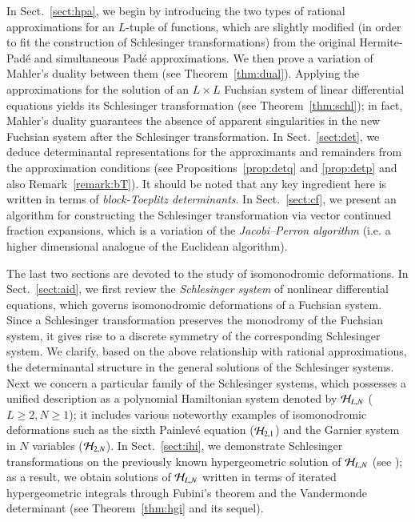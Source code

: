 \documentclass[12pt]{article}
\numberwithin{equation}{section}
\begin{document}
In Sect.~\ref{sect:hpa},
we begin by introducing 
the two types of rational approximations for an $L$-tuple of functions,
which are slightly modified
(in order to fit the construction of Schlesinger transformations)
from the original Hermite-Pad\'e and simultaneous Pad\'e approximations.
We then prove a variation of Mahler's duality between them (see Theorem~\ref{thm:dual}).
Applying the approximations for the solution of an $L \times L$ Fuchsian system of linear differential equations
yields its Schlesinger transformation
(see Theorem~\ref{thm:schl});
in fact,
Mahler's duality guarantees
 the absence of apparent singularities in the new Fuchsian system
after the Schlesinger transformation.
In Sect.~\ref{sect:det},
we deduce determinantal representations for the approximants and remainders
 from the approximation conditions
(see Propositions~\ref{prop:detq}  and \ref{prop:detp}
 and also Remark~\ref{remark:bT}).
 It should be noted that any key ingredient here 
is
 written in terms of {\it block-Toeplitz determinants}.
In Sect.~\ref{sect:cf},
we present an algorithm for constructing  the Schlesinger transformation via vector continued fraction expansions,
which is  a variation of the {\it Jacobi--Perron algorithm}
(i.e. a higher dimensional analogue of the Euclidean algorithm).


The last two sections are devoted to the study of isomonodromic deformations.
In Sect.~\ref{sect:aid},
we first review  the {\it Schlesinger system}
of nonlinear differential equations,
which
governs  isomonodromic deformations of a Fuchsian system.
Since a Schlesinger transformation preserves
 the monodromy of the
Fuchsian system, 
it gives rise to a discrete symmetry of the corresponding Schlesinger system.
We clarify,
based on the above relationship with rational approximations,
 the determinantal structure in the general solutions of the Schlesinger systems.
Next we concern
a particular family
of the Schlesinger systems,
which possesses a unified description as a
polynomial Hamiltonian system denoted by ${\cal H}_{L,N}$ ($L \geq 2, N \geq 1$);
it includes various noteworthy examples 
of isomonodromic deformations 
such as 
the sixth Painlev\'e equation (${\cal H}_{2,1}$)
and the Garnier system in $N$ variables (${\cal H}_{2,N}$).
In  Sect.~\ref{sect:ihi},
we demonstrate 
Schlesinger transformations on the previously known hypergeometric solution of ${\cal H}_{L,N}$ (see \cite{tsu12b});
as a result,
we obtain
solutions of ${\cal H}_{L,N}$ 
written in terms of iterated hypergeometric integrals
through Fubini's theorem and the Vandermonde determinant
(see Theorem~\ref{thm:hgi} and its sequel).
\end{document}
